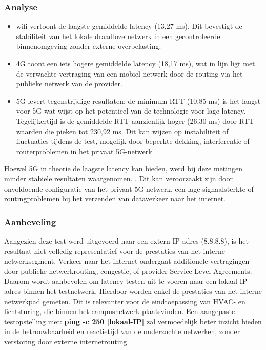 \subsubsection{Analyse}
\begin{itemize}
    \item wifi vertoont de laagste gemiddelde latency (13,27 ms). Dit bevestigt de stabiliteit van het lokale draadloze netwerk in een gecontroleerde binnenomgeving zonder externe overbelasting.
    \item 4G toont een iets hogere gemiddelde latency (18,17 ms), wat in lijn ligt met de verwachte vertraging van een mobiel netwerk door de routing via het publieke netwerk van de provider.
    \item 5G levert tegenstrijdige resultaten: de minimum RTT (10,85 ms) is het laagst voor 5G wat wijst op het potentieel van de technologie voor lage latency. Tegelijkertijd is de gemiddelde RTT aanzienlijk hoger (26,30 ms) door RTT-waarden die pieken tot 230,92 ms. Dit kan wijzen op instabiliteit of fluctuaties tijdens de test, mogelijk door beperkte dekking, interferentie of routerproblemen in het privaat 5G-netwerk.
\end{itemize}
Hoewel 5G in theorie de laagste latency kan bieden, werd bij deze metingen minder stabiele resultaten waargenomen. . Dit kan veroorzaakt zijn door onvoldoende configuratie van het privaat 5G-netwerk, een lage signaalsterkte of routingproblemen bij het verzenden van dataverkeer naar het internet.

\subsubsection{Aanbeveling}
Aangezien deze test werd uitgevoerd naar een extern IP-adres (8.8.8.8), is het resultaat niet volledig representatief voor de prestaties van het interne netwerksegment.
Verkeer naar het internet ondergaat additionele vertragingen door publieke netwerkrouting, congestie, of provider Service Level Agreements. Daarom wordt aanbevolen om latency-testen uit te voeren naar een lokaal IP-adres binnen het testnetwerk. Hierdoor worden  enkel de prestaties van het interne netwerkpad gemeten. Dit is relevanter voor de eindtoepassing van HVAC- en lichtsturing, die binnen het campusnetwerk plaatsvinden. Een aangepaste testopstelling met: \textbf{ping -c 250 [lokaal-IP]} zal vermoedelijk beter inzicht bieden in de betrouwbaarheid en reactietijd van de onderzochte netwerken, zonder verstoring door externe internetrouting.


